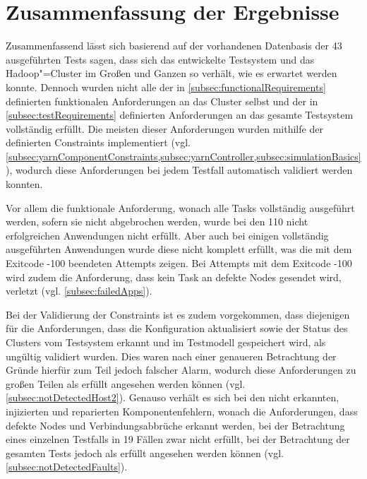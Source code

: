 \section{Zusammenfassung der Ergebnisse}
\label{sec:evaluationResults}

Zusammenfassend lässt sich basierend auf der vorhandenen Datenbasis der 43 ausgeführten Tests sagen, dass sich das entwickelte Testsystem und das Hadoop"=Cluster im Großen und Ganzen so verhält, wie es erwartet werden konnte.
Dennoch wurden nicht alle der in \cref{subsec:functionalRequirements} definierten funktionalen Anforderungen an das Cluster selbst und der in \cref{subsec:testRequirements} definierten Anforderungen an das gesamte Testsystem vollständig erfüllt.
Die meisten dieser Anforderungen wurden mithilfe der definierten Constraints implementiert (vgl. \cref{subsec:yarnComponentConstraints,subsec:yarnController,subsec:simulationBasics}), wodurch diese Anforderungen bei jedem Testfall automatisch validiert werden konnten.

Vor allem die funktionale Anforderung, wonach alle Tasks vollständig ausgeführt werden, sofern sie nicht abgebrochen werden, wurde bei den 110 nicht erfolgreichen Anwendungen nicht erfüllt.
Aber auch bei einigen vollständig ausgeführten Anwendungen wurde diese nicht komplett erfüllt, was die mit dem Exitcode -100 beendeten Attempts zeigen.
Bei Attempts mit dem Exitcode -100 wird zudem die Anforderung, dass kein Task an defekte Nodes gesendet wird, verletzt (vgl. \cref{subsec:failedApps}).

Bei der Validierung der Constraints ist es zudem vorgekommen, dass diejenigen für die Anforderungen, dass die Konfiguration aktualisiert sowie der Status des Clusters vom Testsystem erkannt und im Testmodell gespeichert wird, als ungültig validiert wurden.
Dies waren nach einer genaueren Betrachtung der Gründe hierfür zum Teil jedoch falscher Alarm, wodurch diese Anforderungen zu großen Teilen als erfüllt angesehen werden können (vgl. \cref{subsec:notDetectedHost2}).
Genauso verhält es sich bei den nicht erkannten, injizierten und reparierten Komponentenfehlern, wonach die Anforderungen, dass defekte Nodes und Verbindungsabbrüche erkannt werden, bei der Betrachtung eines einzelnen Testfalls in 19 Fällen zwar nicht erfüllt, bei der Betrachtung der gesamten Tests jedoch als erfüllt angesehen werden können (vgl. \cref{subsec:notDetectedFaults}).

